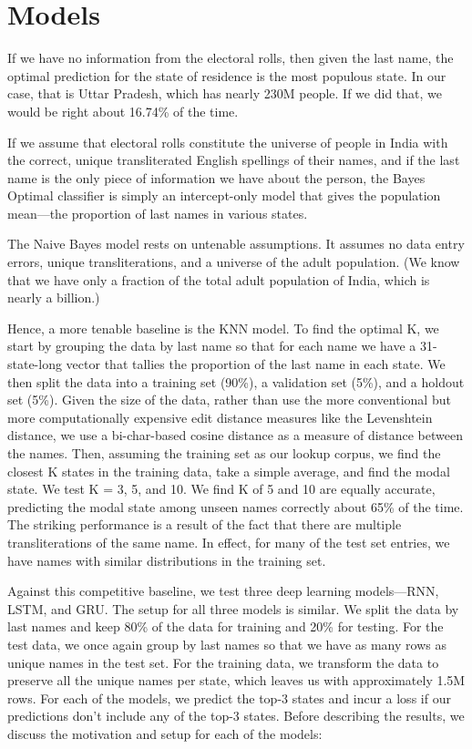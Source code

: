 \documentclass[11pt,  letterpaper]{article}
\begin{document}
\section{Models}

If we have no information from the electoral rolls, then given the last name, the optimal prediction for the state of residence is the most populous state. In our case, that is Uttar Pradesh, which has nearly 230M people. If we did that, we would be right about 16.74\% of the time.

If we assume that electoral rolls constitute the universe of people in India with the correct, unique transliterated English spellings of their names, and if the last name is the only piece of information we have about the person, the Bayes Optimal classifier is simply an intercept-only model that gives the population mean---the proportion of last names in various states. 

The Naive Bayes model rests on untenable assumptions. It assumes no data entry errors, unique transliterations, and a universe of the adult population. (We know that we have only a fraction of the total adult population of India, which is nearly a billion.) 

Hence, a more tenable baseline is the KNN model. To find the optimal K, we start by grouping the data by last name so that for each name we have a 31-state-long vector that tallies the proportion of the last name in each state. We then split the data into a training set (90\%), a validation set (5\%), and a holdout set (5\%). Given the size of the data, rather than use the more conventional but more computationally expensive edit distance measures like the Levenshtein distance, we use a bi-char-based cosine distance as a measure of distance between the names. Then, assuming the training set as our lookup corpus, we find the closest K states in the training data, take a simple average, and find the modal state. We test K = 3, 5, and 10. We find K of 5 and 10 are equally accurate, predicting the modal state among unseen names correctly about 65\% of the time. The striking performance is a result of the fact that there are multiple transliterations of the same name. In effect, for many of the test set entries, we have names with similar distributions in the training set. 

Against this competitive baseline, we test three deep learning models---RNN, LSTM, and GRU. The setup for all three models is similar. We split the data by last names and keep 80\% of the data for training and 20\% for testing. For the test data, we once again group by last names so that we have as many rows as unique names in the test set. For the training data, we transform the data to preserve all the unique names per state, which leaves us with approximately 1.5M rows. For each of the models, we predict the top-3 states and incur a loss if our predictions don't include any of the top-3 states. Before describing the results, we discuss the motivation and setup for each of the models:
\end{document}
